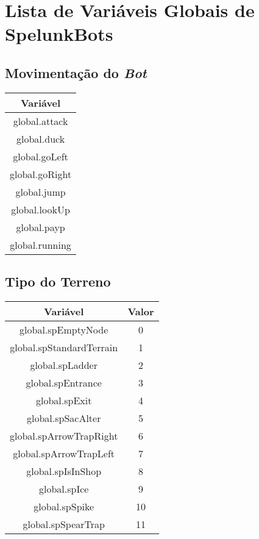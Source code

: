 \chapter{\label{appendix:spelunkbots-variables}Lista de Variáveis Globais
de SpelunkBots}

\section{Movimentação do \textit{Bot}}

\begin{center}
    \begin{tabular}{ |c| }
        \hline
        \textbf{Variável} \\ \hline
        global.attack \\ \hline
        global.duck \\ \hline
        global.goLeft \\ \hline
        global.goRight \\ \hline
        global.jump \\ \hline
        global.lookUp \\ \hline
        global.payp \\ \hline
        global.running \\ \hline
    \end{tabular}
\end{center}

\section{Tipo do Terreno}

\begin{center}
    \begin{tabular}{ |c|c| }
        \hline
        \textbf{Variável} & \textbf{Valor} \\ \hline
        global.spEmptyNode & 0 \\ \hline
        global.spStandardTerrain & 1 \\ \hline
        global.spLadder & 2 \\ \hline
        global.spEntrance & 3 \\ \hline
        global.spExit & 4 \\ \hline
        global.spSacAlter & 5 \\ \hline
        global.spArrowTrapRight & 6 \\ \hline
        global.spArrowTrapLeft & 7 \\ \hline
        global.spIsInShop & 8 \\ \hline
        global.spIce & 9 \\ \hline
        global.spSpike & 10 \\ \hline
        global.spSpearTrap & 11 \\ \hline
    \end{tabular}
\end{center}

